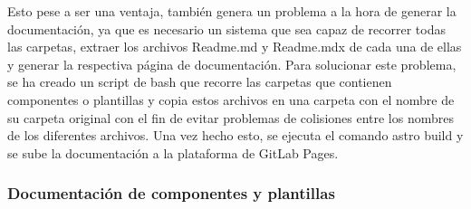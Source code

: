 Esto pese a ser una ventaja, también genera un problema a la hora de
generar la documentación, ya que es necesario un sistema que sea
capaz de recorrer todas las carpetas, extraer los archivos Readme.md
y Readme.mdx de cada una de ellas y generar la respectiva página
de documentación. Para solucionar este problema, se ha creado un
script de bash que recorre las carpetas que contienen componentes o
plantillas y copia estos archivos en una carpeta con el nombre de
su carpeta original con el fin de evitar problemas de colisiones
entre los nombres de los diferentes archivos. Una vez hecho esto,
se ejecuta el comando astro build y se sube la documentación a la
plataforma de GitLab Pages.

\subsubsection{Documentación de componentes y plantillas}
